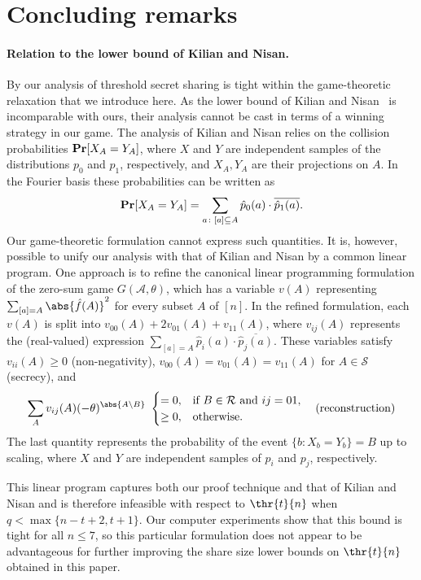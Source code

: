 \documentclass{toc}
\DeclareMathOperator\pr{\mathop{\bf Pr}}
\begin{document}
\section{Concluding remarks}

\paragraph{Relation to the lower bound of Kilian and Nisan.}
By  our analysis of threshold secret sharing is tight within the game-theoretic relaxation that we introduce here.  As the lower bound of Kilian and Nisan~\cite{KilianN90} is incomparable with ours, their analysis cannot be cast in terms of a winning strategy in our game.  The analysis of Kilian and Nisan relies on the collision probabilities $\pr[X_A = Y_A]$, where $X$ and $Y$ are independent samples of the distributions $p_0$ and $p_1$, respectively, and $X_A, Y_A$ are their projections on $A$.  In the Fourier basis these probabilities can be written as
\[
\pr[X_A = Y_A] = \sum_{a\colon [a] \subseteq A} \hat{p}_0(a) \cdot \overline{\hat{p}_1(a)}.
\]
Our game-theoretic formulation cannot express such quantities.  It is, however, 
 possible to unify our analysis with that of Kilian and Nisan by a common linear program.  One approach is to refine the canonical linear programming formulation of the zero-sum game $G(\mathcal{A}, \theta)$, which has a variable $v(A)$ representing $\sum_{[a] = A} \abs{\hat{f}(A)}^2$ for every subset $A$ of $[n]$.  In the refined formulation, each $v(A)$ is split into $v_{00}(A) + 2v_{01}(A) + v_{11}(A)$, where $v_{ij}(A)$ represents the (real-valued) expression $\sum_{[a] = A} \hat{p}_i(a) \cdot \overline{\hat{p}_j(a)}$.  These variables satisfy $v_{ii}(A) \geq 0$ (non-negativity), $v_{00}(A) = v_{01}(A) = v_{11}(A)$ for $A \in \mathcal{S}$ (secrecy), and
\[  \sum_A v_{ij}(A) (-\theta)^{\abs{A \setminus B}} \ 
\begin{cases}
= 0, &\text{if $B \in \mathcal{R}$ and $ij = 01$,} \\
\geq 0, &\text{otherwise}.
\end{cases} 
\quad\text{(reconstruction)}
\]
The last quantity represents the probability of the event $\{b\colon X_b = Y_b\} = B$ up to scaling, where $X$ and $Y$ are independent samples of $p_i$ and $p_j$, respectively.

This linear program captures both our proof technique and that of Kilian and Nisan and is therefore infeasible with respect to $\thr{t}{n}$ when $q < \max\{n - t + 2, t + 1\}$. Our computer experiments show that this bound is tight for all $n \leq 7$, so this particular formulation does not appear to be advantageous for further improving the share size lower bounds on $\thr{t}{n}$ obtained in this paper.
\end{document}
